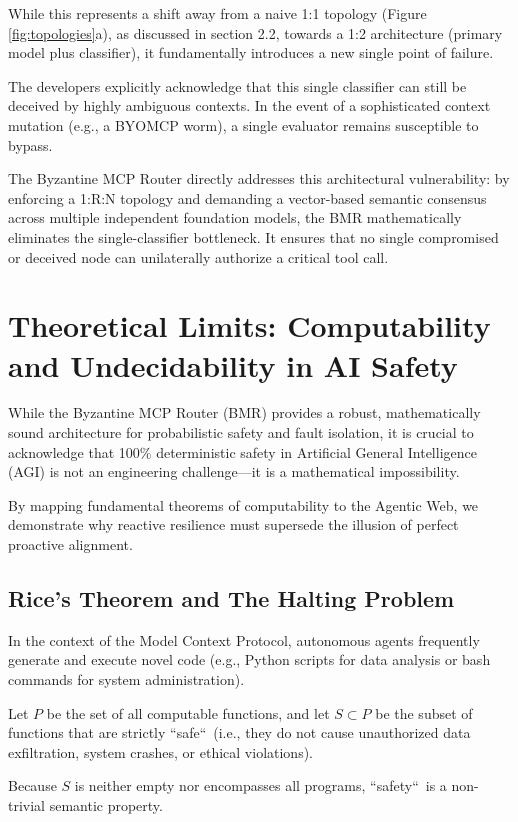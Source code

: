 \documentclass[a4paper,11pt,twocolumn]{article}
\theoremstyle{definition}
\theoremstyle{plain}
\begin{document}
While this represents a shift away from a naive 1:1 topology (Figure \ref{fig:topologies}a), as discussed in section 2.2, towards a 1:2 architecture (primary model plus classifier), it fundamentally introduces a new single point of failure.

The developers explicitly acknowledge that this single classifier can still be deceived by highly ambiguous contexts. In the event of a sophisticated context mutation (e.g., a BYOMCP worm), a single evaluator remains susceptible to bypass.

The Byzantine MCP Router directly addresses this architectural vulnerability: by enforcing a 1:R:N topology and demanding a vector-based semantic consensus across multiple independent foundation models, the BMR mathematically eliminates the single-classifier bottleneck. It ensures that no single compromised or deceived node can unilaterally authorize a critical tool call.

\section{Theoretical Limits: Computability and Undecidability in AI Safety}

While the Byzantine MCP Router (BMR) provides a robust, mathematically sound architecture for probabilistic safety and fault isolation, it is crucial to acknowledge that 100\% deterministic safety in Artificial General Intelligence (AGI) is not an engineering challenge—it is a mathematical impossibility.

By mapping fundamental theorems of computability to the Agentic Web, we demonstrate why reactive resilience must supersede the illusion of perfect proactive alignment.

\subsection{Rice's Theorem and The Halting Problem}
In the context of the Model Context Protocol, autonomous agents frequently generate and execute novel code (e.g., Python scripts for data analysis or bash commands for system administration). 

Let $P$ be the set of all computable functions, and let $S \subset P$ be the subset of functions that are strictly “safe“\ (i.e., they do not cause unauthorized data exfiltration, system crashes, or ethical violations). 


Because $S$ is neither empty nor encompasses all programs, “safety“\ is a non-trivial semantic property.
\end{document}
